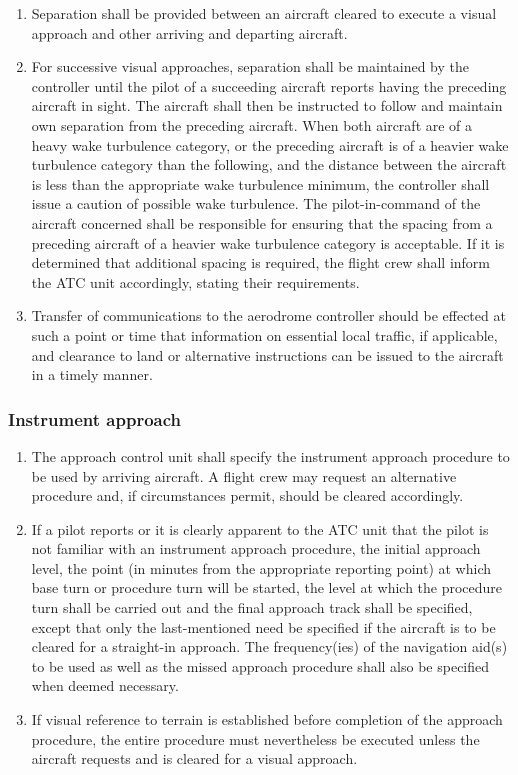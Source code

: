 \documentclass[../vATM.tex]{subfiles}
\begin{document}
\begin{enumerate}
        \item Separation shall be provided between an aircraft cleared to execute a visual approach and other arriving and departing aircraft.
        \item For successive visual approaches, separation shall be maintained by the controller until the pilot of a succeeding aircraft reports having the preceding aircraft in sight. The aircraft shall then be instructed to follow and maintain own separation from the preceding aircraft. When both aircraft are of a heavy wake turbulence category, or the preceding aircraft is of a heavier wake turbulence category than the following, and the distance between the aircraft is less than the appropriate wake turbulence minimum, the controller shall issue a caution of possible wake turbulence. The pilot-in-command of the aircraft concerned shall be responsible for ensuring that the spacing from a preceding aircraft of a heavier wake turbulence category is acceptable. If it is determined that additional spacing is required, the flight crew shall inform the ATC unit accordingly, stating their requirements.
        \item Transfer of communications to the aerodrome controller should be effected at such a point or time that information on essential local traffic, if applicable, and clearance to land or alternative instructions can be issued to the aircraft in a timely manner.
    \end{enumerate}

    \subsubsection{Instrument approach}

    \begin{enumerate}
        \item The approach control unit shall specify the instrument approach procedure to be used by arriving aircraft. A flight crew may request an alternative procedure and, if circumstances permit, should be cleared accordingly.
        \item If a pilot reports or it is clearly apparent to the ATC unit that the pilot is not familiar with an instrument approach procedure, the initial approach level, the point (in minutes from the appropriate reporting point) at which base turn or procedure turn will be started, the level at which the procedure turn shall be carried out and the final approach track shall be specified, except that only the last-mentioned need be specified if the aircraft is to be cleared for a straight-in approach. The frequency(ies) of the navigation aid(s) to be used as well as the missed approach procedure shall also be specified when deemed necessary.
        \item If visual reference to terrain is established before completion of the approach procedure, the entire procedure must nevertheless be executed unless the aircraft requests and is cleared for a visual approach.
    \end{enumerate}
\end{document}
